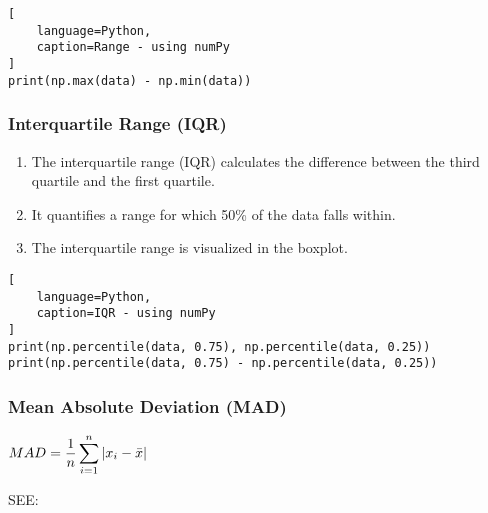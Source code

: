 \begin{lstlisting}[
    language=Python, 
    caption=Range - using numPy
]
print(np.max(data) - np.min(data))
\end{lstlisting}


\subsubsection{Interquartile Range (IQR) \cite{statistics/book/Statistics-for-Data-Scientists/Maurits-Kaptein}} \label{Data/Describing Data/Central Tendency/Interquartile Range (IQR)}

\begin{enumerate}
    \item The interquartile range (IQR) calculates the difference between the third quartile and the first quartile. \hfill \cite{statistics/book/Statistics-for-Data-Scientists/Maurits-Kaptein}

    \item It quantifies a range for which 50\% of the data falls within. \hfill \cite{statistics/book/Statistics-for-Data-Scientists/Maurits-Kaptein}

    \item The interquartile range is visualized in the boxplot. \hfill \cite{statistics/book/Statistics-for-Data-Scientists/Maurits-Kaptein}
\end{enumerate}

\begin{lstlisting}[
    language=Python, 
    caption=IQR - using numPy
]
print(np.percentile(data, 0.75), np.percentile(data, 0.25))
print(np.percentile(data, 0.75) - np.percentile(data, 0.25))
\end{lstlisting}


\subsubsection{Mean Absolute Deviation (MAD) \cite{statistics/book/Statistics-for-Data-Scientists/Maurits-Kaptein}} \label{Data/Describing Data/Central Tendency/Mean Absolute Deviation (MAD)}

$
    MAD
    = \dfrac{1}{n} \displaystyle\sum_{i=1}^{n} \left| x_i - \bar{x} \right|
$ \hfill \cite{statistics/book/Statistics-for-Data-Scientists/Maurits-Kaptein}

\vspace{0.2cm}

SEE: 

